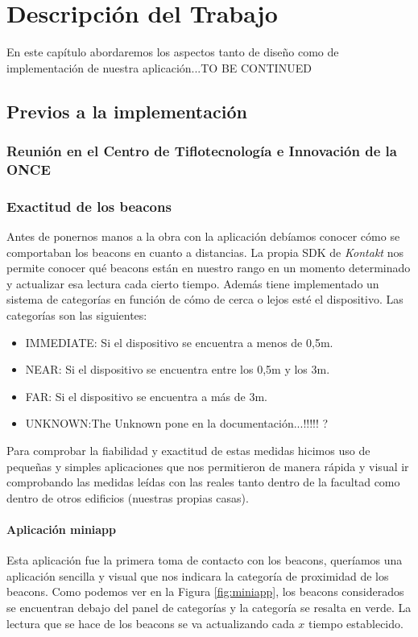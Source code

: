 \chapter{Descripción del Trabajo}
\label{cap:descripcionTrabajo}

En este capítulo abordaremos los aspectos tanto de diseño como de implementación de nuestra aplicación...TO BE CONTINUED

\section{Previos a la implementación}

\subsection{Reunión en el Centro de Tiflotecnología e Innovación de la ONCE}

\subsection{Exactitud de los beacons}

Antes de ponernos manos a la obra con la aplicación debíamos conocer cómo se comportaban los beacons en cuanto a distancias. La propia SDK de \textit{Kontakt} nos permite conocer qué beacons están en nuestro rango en un momento determinado y actualizar esa lectura cada cierto tiempo. Además tiene implementado un sistema de categorías en función de cómo de cerca o lejos esté el dispositivo. Las categorías son las siguientes:

\begin{itemize}
	\item IMMEDIATE: Si el dispositivo se encuentra a menos de 0,5m.
	\item NEAR: Si el dispositivo se encuentra entre los 0,5m y los 3m.
	\item FAR: Si el dispositivo se encuentra a más de 3m.
	\item UNKNOWN:The Unknown pone en la documentación...!!!!! ?
\end{itemize}

Para comprobar la fiabilidad y exactitud de estas medidas hicimos uso de pequeñas y simples aplicaciones que nos permitieron de manera rápida y visual ir comprobando las medidas leídas con las reales tanto dentro de la facultad como dentro de otros edificios (nuestras propias casas).

\subsubsection{Aplicación miniapp}
Esta aplicación fue la primera toma de contacto con los beacons, queríamos una aplicación sencilla y visual que nos indicara la categoría de proximidad de los beacons. Como podemos ver en la Figura \ref{fig:miniapp}, los beacons considerados se encuentran debajo del panel de categorías y la categoría se resalta en verde. La lectura que se hace de los beacons se va actualizando cada $x$ tiempo establecido. 

